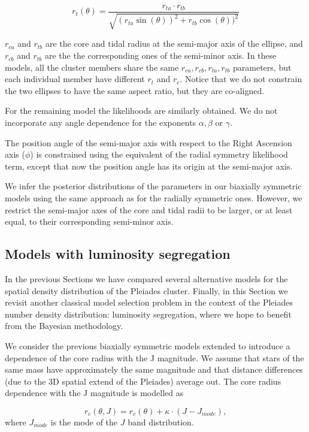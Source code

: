 \begin{equation}
r_t(\theta) = \frac{r_{ta}\cdot r_{tb}}{\sqrt{(r_{ta}\sin(\theta))^2+r_{tb}\cos(\theta))^2}}
\label{eq:anglert}
\end{equation}

$r_{ca}$ and $r_{tb}$ are the core and tidal radius at the semi-major axis of the ellipse, and $r_{cb}$
and $r_{tb}$ are the the corresponding ones of the semi-minor axis. In these models, all the cluster members share the same
$r_{ca},r_{cb},r_{ta},r_{tb}$ parameters, but each individual member have different $r_t$ and $r_c$.
Notice that we do not constrain the two ellipses to have the same aspect ratio, but they are co-aligned.

For the remaining model the likelihoods are similarly obtained. We
do not incorporate any angle dependence for the exponents $\alpha,\beta$ or $\gamma$.  

The position angle of the semi-major axis with respect to the Right
Ascension axis ($\phi$) is constrained using the equivalent of the
radial symmetry likelihood term, except that now the position angle has
its origin at the semi-major axis.

We infer the posterior distributions of the parameters in our biaxially symmetric models using
the same approach as for the radially symmetric ones. However, we restrict
the semi-major axes of the core and tidal radii to be larger, or at least equal, to their corresponding semi-minor axis.

\subsection{Models with luminosity segregation}
\label{sec:lumin-segreg}
In the previous Sections we have compared several alternative models
for the spatial density distribution of the Pleiades
cluster. Finally, in this Section we revisit another classical model selection problem in the
context of the Pleiades number density distribution: luminosity segregation, where we hope to
benefit from the Bayesian methodology.

We consider the previous biaxially symmetric models extended to introduce
a dependence of the core radius with the J magnitude. We assume that stars of the same
mass have approximately the same magnitude and that distance
differences (due to the 3D spatial extend of the Pleiades) average
out. The core radius dependence with the J magnitude is modelled as

\begin{equation}
\label{eq:rc_segregated}
  r_c(\theta,J) = r_c(\theta)+\kappa\cdot(J- J_{mode}),
\end{equation}
where $J_{mode}$ is the mode of the $J$ band distribution. 

